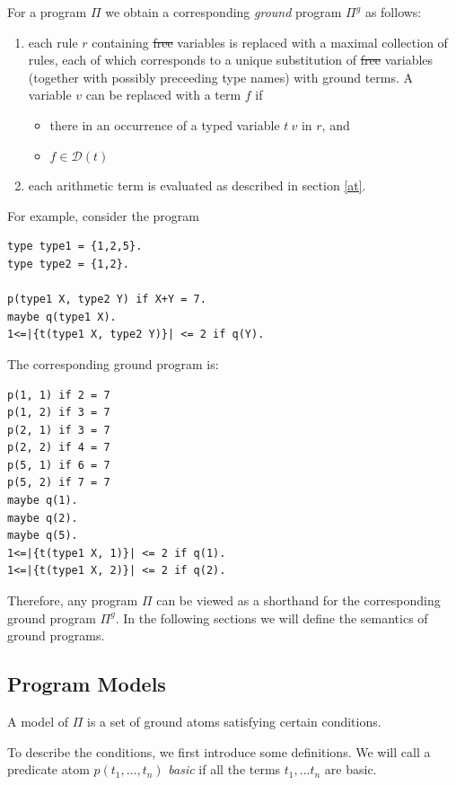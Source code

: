 \documentclass[a4paper,10pt]{article}
\providecommand{\DIFaddtex}[1]{{\protect\color{blue}\uwave{#1}}} %
\providecommand{\DIFdeltex}[1]{{\protect\color{red}\sout{#1}}}                      %
\providecommand{\DIFaddbegin}{} %
\providecommand{\DIFaddend}{} %
\providecommand{\DIFdelbegin}{} %
\providecommand{\DIFdelend}{} %
\providecommand{\DIFadd}[1]{\texorpdfstring{\DIFaddtex{#1}}{#1}} %
\providecommand{\DIFdel}[1]{\texorpdfstring{\DIFdeltex{#1}}{}} %
\begin{document}
\DIFdelend For a program $\Pi$ \DIFaddbegin \DIFadd{containing variables }\DIFaddend we obtain a corresponding \textit{ground} program $\Pi^g$ as follows:
\begin{enumerate}
\item each rule $r$ containing \DIFdelbegin \DIFdel{free }\DIFdelend variables is replaced with a maximal collection of rules, each of which corresponds to a unique substitution 
of  \DIFdelbegin \DIFdel{free }\DIFdelend variables (together with possibly preceeding type names)  with ground terms. A variable $v$ can be replaced with a term $f$ if
\begin{itemize}
\item there in an occurrence of a typed variable $t~v$ in $r$, and
\item  $f\in \mathcal{D}(t)$
\end{itemize}  
\item each arithmetic term is evaluated as described in section  \ref{at}.
\end{enumerate}

\medskip\noindent
For example, consider the program 
\begin{verbatim}
type type1 = {1,2,5}.
type type2 = {1,2}.

p(type1 X, type2 Y) if X+Y = 7.
maybe q(type1 X).
1<=|{t(type1 X, type2 Y)}| <= 2 if q(Y).
\end{verbatim}

\medskip\noindent
The corresponding ground program is:
\begin{verbatim}
p(1, 1) if 2 = 7
p(1, 2) if 3 = 7
p(2, 1) if 3 = 7
p(2, 2) if 4 = 7
p(5, 1) if 6 = 7
p(5, 2) if 7 = 7
maybe q(1).
maybe q(2).
maybe q(5).
1<=|{t(type1 X, 1)}| <= 2 if q(1).
1<=|{t(type1 X, 2)}| <= 2 if q(2).
\end{verbatim}

\medskip\noindent
Therefore, any program $\Pi$ can be viewed as a shorthand for the corresponding ground program $\Pi^g$.
In the following sections we will define the semantics of ground programs.


\subsection{Program Models}\label{rsat}
A model of $\Pi$ is a set of ground atoms satisfying certain conditions.

To describe the conditions,  we  first introduce some definitions.
 We will call a predicate atom $p(t_1,\ldots, t_n)$ \textit{basic} if all the terms $t_1,\ldots t_n$ are basic.
 \DIFaddbegin 
\end{document}
